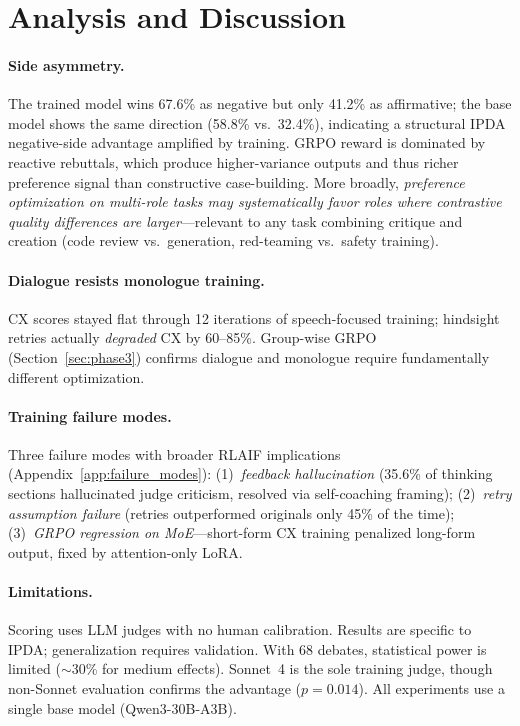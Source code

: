 \section{Analysis and Discussion}
\label{sec:analysis}

\paragraph{Side asymmetry.}
The trained model wins 67.6\% as negative but only 41.2\% as affirmative;
the base model shows the same direction (58.8\% vs.\ 32.4\%), indicating
a structural IPDA negative-side advantage amplified by training. GRPO
reward is dominated by reactive rebuttals, which produce higher-variance
outputs and thus richer preference signal than constructive
case-building. More broadly, \emph{preference optimization on multi-role
tasks may systematically favor roles where contrastive quality
differences are larger}---relevant to any task combining critique and
creation (code review vs.\ generation, red-teaming vs.\ safety training).

\paragraph{Dialogue resists monologue training.}
CX scores stayed flat through 12 iterations of speech-focused training;
hindsight retries actually \emph{degraded} CX by 60--85\%. Group-wise
GRPO (Section~\ref{sec:phase3}) confirms dialogue and monologue require
fundamentally different optimization.

\paragraph{Training failure modes.}
Three failure modes with broader RLAIF implications
(Appendix~\ref{app:failure_modes}): (1)~\emph{feedback hallucination}
(35.6\% of thinking sections hallucinated judge criticism, resolved via
self-coaching framing); (2)~\emph{retry assumption failure} (retries
outperformed originals only 45\% of the time); (3)~\emph{GRPO regression
on MoE}---short-form CX training penalized long-form output, fixed by
attention-only LoRA.

\paragraph{Limitations.}
Scoring uses LLM judges with no human calibration. Results are specific
to IPDA; generalization requires validation. With 68 debates,
statistical power is limited ($\sim$30\% for medium effects). Sonnet~4
is the sole training judge, though non-Sonnet evaluation confirms the
advantage ($p = 0.014$). All experiments use a single base model
(Qwen3-30B-A3B).
